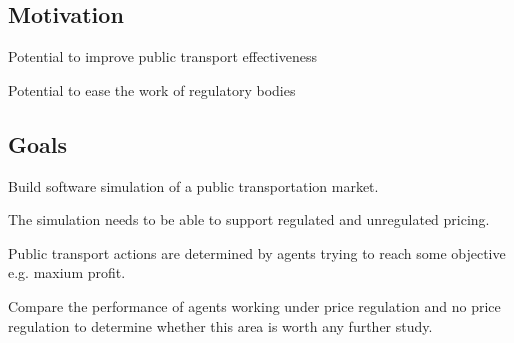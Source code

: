 \subsection{Motivation}

Potential to improve public transport effectiveness

Potential to ease the work of regulatory bodies

\subsection{Goals}

Build software simulation of a public transportation market.

The simulation needs to be able to support regulated and unregulated pricing.

Public transport actions are determined by agents trying to reach some objective
e.g. maxium profit.

Compare the performance of agents working under price regulation and no price
regulation to determine whether this area is worth any further study.
